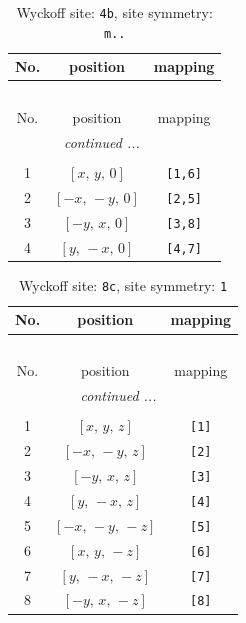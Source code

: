 \documentclass[fleqn,8pt]{jsarticle}
\begin{document}
\begin{longtable}{ccc}
\caption{Wyckoff site: {\tt 4b}, site symmetry: {\tt m..}}
 \\
 \hline \hline
No. & position & mapping \\ \hline \endfirsthead

\multicolumn{2}{l}{\tablename\ \thetable{}} \\
 \hline \hline
No. & position & mapping \\ \hline \endhead

 \hline \hline
\multicolumn{2}{r}{\footnotesize\it continued ...} \\ \endfoot

 \hline \hline
\multicolumn{2}{r}{} \\ \endlastfoot

1 & $\left[ x,\, y,\, 0 \right]$ & {\tt [1,6]} \\ \hline
2 & $\left[ - x,\, - y,\, 0 \right]$ & {\tt [2,5]} \\ \hline
3 & $\left[ - y,\, x,\, 0 \right]$ & {\tt [3,8]} \\ \hline
4 & $\left[ y,\, - x,\, 0 \right]$ & {\tt [4,7]} \\
\end{longtable}
\renewcommand{\arraystretch}{1.2}
\begin{longtable}{ccc}
\caption{Wyckoff site: {\tt 8c}, site symmetry: {\tt 1}}
 \\
 \hline \hline
No. & position & mapping \\ \hline \endfirsthead

\multicolumn{2}{l}{\tablename\ \thetable{}} \\
 \hline \hline
No. & position & mapping \\ \hline \endhead

 \hline \hline
\multicolumn{2}{r}{\footnotesize\it continued ...} \\ \endfoot

 \hline \hline
\multicolumn{2}{r}{} \\ \endlastfoot

1 & $\left[ x,\, y,\, z \right]$ & {\tt [1]} \\ \hline
2 & $\left[ - x,\, - y,\, z \right]$ & {\tt [2]} \\ \hline
3 & $\left[ - y,\, x,\, z \right]$ & {\tt [3]} \\ \hline
4 & $\left[ y,\, - x,\, z \right]$ & {\tt [4]} \\ \hline
5 & $\left[ - x,\, - y,\, - z \right]$ & {\tt [5]} \\ \hline
6 & $\left[ x,\, y,\, - z \right]$ & {\tt [6]} \\ \hline
7 & $\left[ y,\, - x,\, - z \right]$ & {\tt [7]} \\ \hline
8 & $\left[ - y,\, x,\, - z \right]$ & {\tt [8]} \\
\end{longtable}
\end{document}
